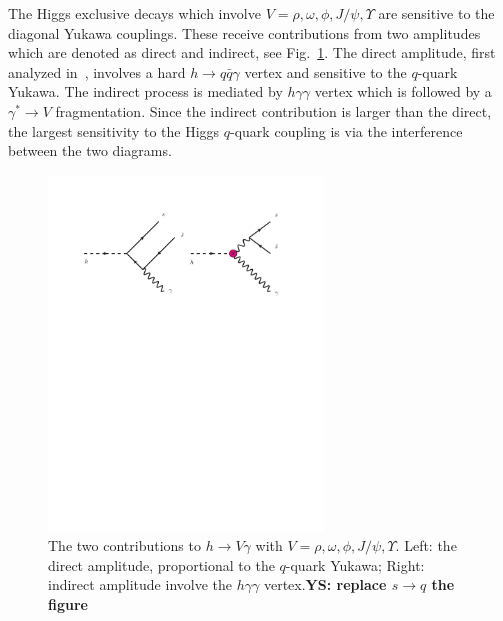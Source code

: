\documentclass[../report.tex]{subfiles}
\begin{document}
The Higgs exclusive decays which involve $V=\rho,\omega,\phi,J/\psi,\Upsilon$ are sensitive to the diagonal Yukawa couplings. 
These receive contributions from two amplitudes which are denoted as direct and indirect, see Fig.~\ref{fig:hexlusive}. 
The direct amplitude, first analyzed in~\cite{Keung:1983ac}, involves a hard $h\to q\bar{q}\gamma$ vertex and sensitive to the $q$-quark Yukawa. 
The indirect process is mediated by $h\gamma\gamma$ vertex which is followed by a $\gamma^*\to V$ fragmentation. 
Since the indirect contribution is larger than the direct, the largest sensitivity to the Higgs $q$-quark coupling is via the interference between the two diagrams. 
\begin{figure}[t]
\begin{center}
\includegraphics[width=0.65\textwidth]{higgs_exclusive_diag.pdf}
\caption{The two contributions to $h \to V\gamma$ with $V=\rho,\omega,\phi,J/\psi,\Upsilon$. Left: the direct amplitude, proportional to  the $q$-quark Yukawa; Right: indirect amplitude involve the $h\gamma\gamma$ vertex.{\bf YS: replace $s\to q$ the figure}}
\label{fig:hexlusive}
\end{center}
\end{figure}
\end{document}
